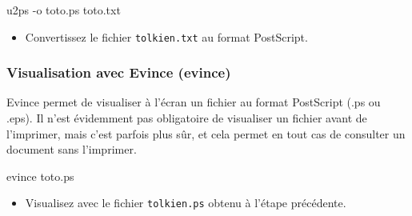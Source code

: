 \documentclass[a4paper,10pt]{article}
\begin{document}
\begin{commandes}
u2ps -o toto.ps toto.txt
\end{commandes}

\begin{maw}
\begin{itemize}
  \item Convertissez le fichier \texttt{tolkien.txt} au format PostScript.
\end{itemize}
\end{maw}


% 

\subsubsection{Visualisation avec Evince (evince)}

Evince permet de visualiser à l'écran un fichier au format PostScript (.ps
ou .eps).
Il n'est évidemment pas obligatoire de visualiser un fichier avant
de l'imprimer, mais c'est parfois plus sûr, et cela permet en tout cas de
consulter un document sans l'imprimer.

\begin{commandes}
evince toto.ps
\end{commandes}

\begin{maw}
\begin{itemize}
  \item Visualisez avec  le fichier \texttt{tolkien.ps}
        obtenu à l'étape précédente.
\end{itemize}
\end{maw}
\end{document}
